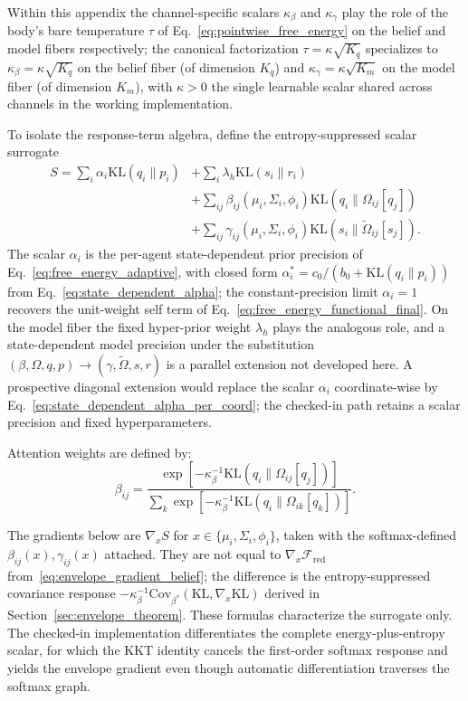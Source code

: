 \documentclass[11pt]{article}
\begin{document}
Within this appendix the channel-specific scalars $\kappa_\beta$ and $\kappa_\gamma$ play the role of the body's bare temperature $\tau$ of Eq.~\eqref{eq:pointwise_free_energy} on the belief and model fibers respectively; the canonical factorization $\tau = \kappa\sqrt{K_q}$ specializes to $\kappa_\beta = \kappa\sqrt{K_q}$ on the belief fiber (of dimension $K_q$) and $\kappa_\gamma = \kappa\sqrt{K_m}$ on the model fiber (of dimension $K_m$), with $\kappa > 0$ the single learnable scalar shared across channels in the working implementation.

To isolate the response-term algebra, define the entropy-suppressed scalar surrogate
\begin{equation}
\begin{aligned}
S = \sum_i \alpha_i \mathrm{KL}(q_i \| p_i) &+ \sum_i \lambda_h \mathrm{KL}(s_i \| r_i) \\
 &+ \sum_{ij} \beta_{ij}(\mu_i, \Sigma_i, \phi_i) \mathrm{KL}(q_i \| \Omega_{ij}[q_j]) \\
 &+ \sum_{ij} \gamma_{ij}(\mu_i, \Sigma_i, \phi_i) \mathrm{KL}(s_i \| \tilde{\Omega}_{ij}[s_j]).
\end{aligned}
\end{equation}
The scalar $\alpha_i$ is the per-agent state-dependent prior precision of Eq.~\eqref{eq:free_energy_adaptive}, with closed form $\alpha_i^* = c_0/(b_0 + \mathrm{KL}(q_i \| p_i))$ from Eq.~\eqref{eq:state_dependent_alpha}; the constant-precision limit $\alpha_i = 1$ recovers the unit-weight self term of Eq.~\eqref{eq:free_energy_functional_final}. On the model fiber the fixed hyper-prior weight $\lambda_h$ plays the analogous role, and a state-dependent model precision under the substitution $(\beta, \Omega, q, p) \to (\gamma, \tilde\Omega, s, r)$ is a parallel extension not developed here. A prospective diagonal extension would replace the scalar $\alpha_i$ coordinate-wise by Eq.~\eqref{eq:state_dependent_alpha_per_coord}; the checked-in path retains a scalar precision and fixed hyperparameters.

Attention weights are defined by:
\begin{equation}
\beta_{ij} = \frac{\exp\left[-\kappa_\beta^{-1}\mathrm{KL}(q_i \| \Omega_{ij}[q_j])\right]}{\sum_k \exp\left[-\kappa_\beta^{-1}\mathrm{KL}(q_i \| \Omega_{ik}[q_k])\right]}.
\end{equation}

The gradients below are $\nabla_x S$ for $x \in \{\mu_i, \Sigma_i, \phi_i\}$, taken with the softmax-defined $\beta_{ij}(x), \gamma_{ij}(x)$ attached. They are not equal to $\nabla_x \mathcal{F}_{\mathrm{red}}$ from~\eqref{eq:envelope_gradient_belief}; the difference is the entropy-suppressed covariance response $-\kappa_\beta^{-1}\mathrm{Cov}_{\beta^*}(\mathrm{KL}, \nabla_x \mathrm{KL})$ derived in Section~\ref{sec:envelope_theorem}. These formulas characterize the surrogate only. The checked-in implementation differentiates the complete energy-plus-entropy scalar, for which the KKT identity cancels the first-order softmax response and yields the envelope gradient even though automatic differentiation traverses the softmax graph.
\end{document}
